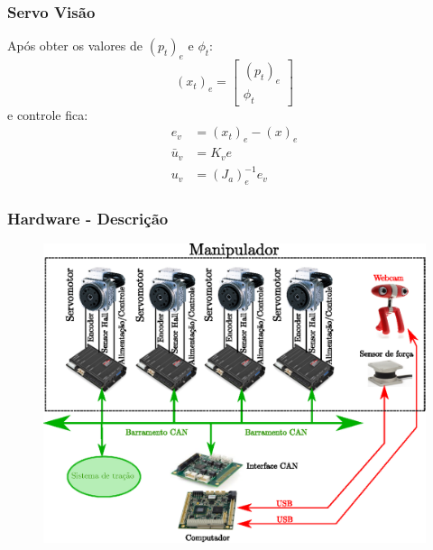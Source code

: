 \documentclass{beamer}
\newcommand\m[1]{\begin{bmatrix}#1\end{bmatrix}}
\begin{document}
\begin{frame}
\frametitle{Servo Visão}

Após obter os valores de $(p_t)_e$ e $\phi_t$:
\begin{equation}
(x_t)_e = \m{(p_t)_e \\ \phi_t }
\end{equation} e controle fica:
\begin{align}
{e_v} &= ({x}_t)_e - ({x})_e \\
{\bar{u}_v} &= {K}_v {e}  \\
{u_v} &= ({J}_{a})_e^{-1} {e_v}
\end{align}
\end{frame}



\begin{frame}
\frametitle{Hardware - Descrição}
\begin{figure}
\includegraphics[width=0.8\linewidth]{./img/integration_diagram.eps}
\end{figure}
\end{frame}
\end{document}
